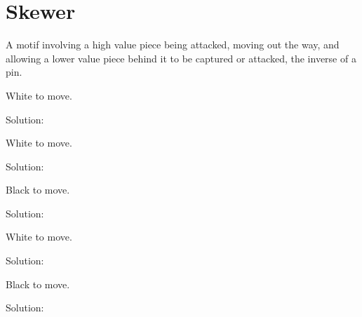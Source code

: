 \documentclass{book}
\begin{document}
\section{Skewer}
A motif involving a high value piece being attacked, moving out the way, and allowing a lower value piece behind it to be captured or attacked, the inverse of a pin.\begin{multicols}{2} 
\begin{samepage} 
\newgame 


 
\showboard
 
 White to move. 
 
Solution: 
 
\end{samepage}\begin{samepage} 
\newgame 


 
\showboard
 
 White to move. 
 
Solution: 
 
\end{samepage}\begin{samepage} 
\newgame 


 
\showboard
 
 Black to move. 
 
Solution: 
 
\end{samepage}\begin{samepage} 
\newgame 


 
\showboard
 
 White to move. 
 
Solution: 
 
\end{samepage}\begin{samepage} 
\newgame 


 
\showboard
 
 Black to move. 
 
Solution: 
 
\end{samepage}\end{multicols} 
\newpage 
\end{document}
